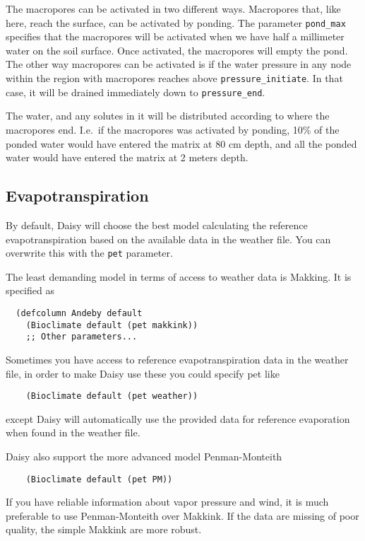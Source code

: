 \documentclass[a4paper]{article}
\begin{document}
The macropores can be activated in two different ways.  Macropores
that, like here, reach the surface, can be activated by ponding.  The
parameter \texttt{pond\_max} specifies that the macropores will be
activated when we have half a millimeter water on the soil surface.
Once activated, the macropores will empty the pond.  The other way
macropores can be activated is if the water pressure in any node
within the region with macropores reaches above
\texttt{pressure\_initiate}.  In that case, it will be drained
immediately down to \texttt{pressure\_end}.

The water, and any solutes in it will be distributed according to
where the macropores end.  I.e.\ if the macropores was activated by
ponding, 10\% of the ponded water would have entered the matrix at 80
cm depth, and all the ponded water would have entered the matrix at 2
meters depth.

\subsection{Evapotranspiration}
\label{sec:bioclimate}

By default, Daisy will choose the best model calculating the reference
evapotranspiration based on the available data in the weather file.
You can overwrite this with the \texttt{pet} parameter.

The least demanding model in terms of access to weather data is
Makking.  It is specified as
\begin{verbatim}
  (defcolumn Andeby default
    (Bioclimate default (pet makkink))
    ;; Other parameters...
\end{verbatim}

Sometimes you have access to reference evapotranspiration data in the
weather file, in order to make Daisy use these you could specify
pet like
\begin{verbatim}
    (Bioclimate default (pet weather))
\end{verbatim}
except Daisy will automatically use the provided data for reference
evaporation when found in the weather file.

Daisy also support the more advanced model Penman-Monteith
\begin{verbatim}
    (Bioclimate default (pet PM))
\end{verbatim}
If you have reliable information about vapor pressure and wind, it is
much preferable to use Penman-Monteith over Makkink.  If the data are
missing of poor quality, the simple Makkink are more robust.
\end{document}
